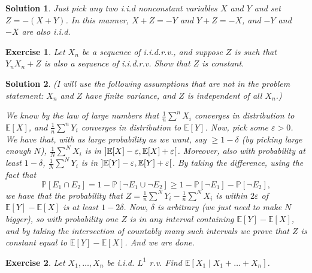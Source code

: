 \documentclass{article}
\newtheorem{ex}{Exercise}
\theoremstyle{nonumberplain}
\newtheorem{sol}{Solution}
\newcommand{\EV}{\mathbb{E}}
\newcommand{\PP}{\mathbb{P}}
\begin{document}
\begin{sol}
Just pick any two i.i.d nonconstant variables $X$ and $Y$ and set $Z = -(X+Y)$. In this manner, $X+Z = -Y$ and $Y+Z = -X$, and $-Y$ and $-X$ are also i.i.d.
\end{sol}

\begin{ex}
Let $X_n$ be a sequence of i.i.d.r.v., and suppose $Z$ is such that $Y_n X_n + Z$ is also a sequence of i.i.d.r.v. Show that $Z$ is constant.
\end{ex}

\begin{sol}
(I will use the following assumptions that are not in the problem statement: $X_n$ and $Z$ have finite variance, and $Z$ is independent of all $X_n$.)

We know by the law of large numbers that $\frac1n \sum^n X_i$ converges in distribution to $\EV[X]$, and $\frac1n \sum^n Y_i$ converges in distribution to $\EV[Y]$. Now, pick some $\varepsilon > 0$. We have that, with as large probability as we want, say $\geq 1-\delta$ (by picking large enough $N$), $\frac1N \sum^N X_i$ is in $\ointerval{\EV[X]-\varepsilon}{\EV[X]+\varepsilon}$. Moreover, also with probability at least $1-\delta$, $\frac1N \sum^N Y_i$ is in $\ointerval{\EV[Y]-\varepsilon}{\EV[Y]+\varepsilon}$. By taking the difference, using the fact that
\begin{equation}
\PP[E_1 \cap E_2] = 1 - \PP[\neg E_1 \cup \neg E_2] \geq 1 - \PP[\neg E_1] - \PP[\neg E_2],
\end{equation}
we have that the probability that $Z = \frac1n \sum^N Y_i - \frac1n \sum^N X_i$ is within $2\varepsilon$ of $\EV[Y] - \EV[X]$ is at least $1-2\delta$. Now, $\delta$ is arbitrary (we just need to make $N$ bigger), so with probability one $Z$ is in any interval containing $\EV[Y] - \EV[X]$, and by taking the intersection of countably many such intervals we prove that $Z$ is constant equal to $\EV[Y] - \EV[X]$. And we are done.
\end{sol}

\begin{ex}
Let $X_1, \dots, X_n$ be i.i.d. $L^1$ r.v. Find $\EV[X_1 \mid X_1 + \dots + X_n]$.
\end{ex}
\end{document}
